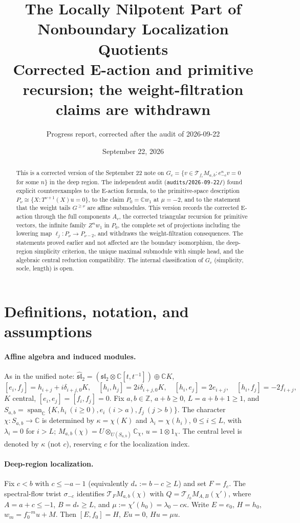 \documentclass[11pt]{article}
\title{The Locally Nilpotent Part of Nonboundary Localization Quotients\\
  \large Corrected E-action and primitive recursion; the weight-filtration
  claims are withdrawn}
\author{Progress report, corrected after the audit of 2026-09-22}
\date{September 22, 2026}
\newcommand{\C}{\mathbb C}
\newcommand{\Z}{\mathbb Z}
\newcommand{\g}{\widehat{\mathfrak{sl}}_2}
\newcommand{\Span}{\operatorname{span}_{\C}}
\begin{document}
\maketitle

\begin{abstract}
This is a corrected version of the September 22 note on
$G_c=\{v\in\mathcal T_{f_c}M_{a,b}:e_{-c}^nv=0$ for some $n\}$ in the deep
region. The independent audit (\texttt{audits/2026-09-22/}) found explicit
counterexamples to the E-action formula, to the primitive-space description
$P_\nu\cong\{X:T^{\nu+1}(X)u=0\}$, to the claim $P_0=\C w_1$ at $\mu=-2$,
and to the statement that the weight tails $G^{\ge\nu}$ are affine
submodules. This version records the corrected E-action through the full
components $A_r$, the corrected triangular recursion for primitive vectors,
the infinite family $Z^nw_1$ in $P_0$, the complete set of projections
including the lowering map $\ell_j:P_\nu\to P_{\nu-2}$, and withdraws the
weight-filtration consequences. The statements proved earlier and not
affected are the boundary isomorphism, the deep-region simplicity criterion,
the unique maximal submodule with simple head, and the algebraic central
reduction compatibility. The internal classification of $G_c$ (simplicity,
socle, length) is open.
\end{abstract}

\section{Definitions, notation, and assumptions}

\paragraph{Affine algebra and induced modules.}
As in the unified note: $\g=(\mathfrak{sl}_2\otimes\C[t,t^{-1}])\oplus\C K$,
\[
 [e_i,f_j]=h_{i+j}+i\delta_{i+j,0}K,\quad [h_i,h_j]=2i\delta_{i+j,0}K,\quad
 [h_i,e_j]=2e_{i+j},\quad [h_i,f_j]=-2f_{i+j},
\]
$K$ central, $[e_i,e_j]=[f_i,f_j]=0$. Fix $a,b\in\Z$, $a+b\ge0$,
$L=a+b+1\ge1$, and
$S_{a,b}=\Span\{K,h_i\ (i\ge0),e_i\ (i>a),f_j\ (j>b)\}$. The character
$\chi:S_{a,b}\to\C$ is determined by $\kappa=\chi(K)$ and
$\lambda_i=\chi(h_i)$, $0\le i\le L$, with $\lambda_i=0$ for $i>L$;
$M_{a,b}(\chi)=U\otimes_{U(S_{a,b})}\C_\chi$, $u=1\otimes1_\chi$. The central
level is denoted by $\kappa$ (not $c$), reserving $c$ for the localization
index.

\paragraph{Deep-region localization.}
Fix $c<b$ with $c\le-a-1$ (equivalently $d_*:=b-c\ge L$) and set $F=f_c$.
The spectral-flow twist $\sigma_{-c}$ identifies $\mathcal T_FM_{a,b}(\chi)$
with $Q=\mathcal T_{f_0}M_{A,B}(\chi')$, where $A=a+c\le-1$, $B=d_*\ge L$,
and $\mu:=\chi'(h_0)=\lambda_0-c\kappa$. Write $E=e_0$, $H=h_0$,
$w_m=f_0^{-m}u+M$. Then $[E,f_0]=H$, $Eu=0$, $Hu=\mu u$.
\end{document}
